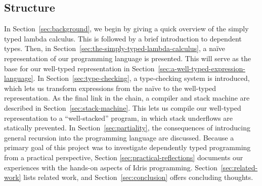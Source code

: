 \subsection{Structure}
In Section~\ref{sec:background}, we begin by giving a quick overview of the simply typed lambda calculus. This is followed by a brief introduction to dependent types. Then, in Section~\ref{sec:the-simply-typed-lambda-calculus}, a na\"{i}ve representation of our programming language is presented. This will serve as the base for our well-typed representation in Section~\ref{sec:a-well-typed-expression-language}. In Section~\ref{sec:type-checking}, a type-checking system is introduced, which lets us transform expressions from the na\"{i}ve to the well-typed representation. As the final link in the chain, a compiler and stack machine are described in Section~\ref{sec:stack-machine}. This lets us compile our well-typed representation to a ``well-stacked'' program, in which stack underflows are statically prevented. In Section~\ref{sec:partiality}, the consequences of introducing general recursion into the programming language are discussed. Because a primary goal of this project was to investigate dependently typed programming from a practical perspective, Section \ref{sec:practical-reflections} documents our experiences with the hands-on aspects of Idris programming. Section~\ref{sec:related-work} lists related work, and Section~\ref{sec:conclusion} offers concluding thoughts.
